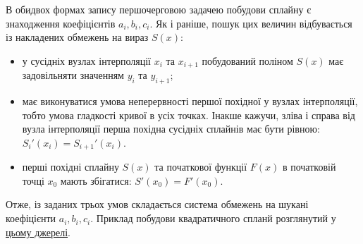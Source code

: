 \documentclass[a4paper,14pt]{extarticle} %
\begin{document}
\begin{enumerate}
    В обидвох формах запису першочерговою задачею побудови сплайну є знаходження коефіцієнтів $a_i,b_i,c_i$. Як 
    і раніше, пошук цих величин відбувається із накладених обмежень на вираз $S(x)$:
    \begin{itemize}
        \item у сусідніх вузлах інтерполяції $x_i$ та $x_{i+1}$ побудований поліном $S(x)$ має задовільняти 
        значенням $y_i$ та $y_{i+1}$;
        \item має виконуватися умова неперервності першої похідної у вузлах інтерполяції, тобто умова 
        гладкості кривої в усіх точках. Інакше кажучи, зліва і справа від вузла інтерполяції перша похідна 
        сусідніх сплайнів має бути рівною: $S_i'(x_i)=S_{i+1}'(x_i)$.
        \item перші похідні сплайну $S(x)$ та початкової функції $F(x)$ в початковій точці $x_0$ мають збігатися: 
        $S'(x_0)=F'(x_0)$.
    \end{itemize}

    Отже, із заданих трьох умов складається система обмежень на шукані коефіцієнти $a_i,b_i,c_i$. Приклад 
    побудови квадратичного спланй розглянутий у
    \href{https://studfile.net/preview/1865619/page:2/}{цьому джерелі}. 


\end{enumerate}
\end{document}
